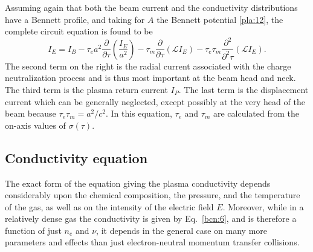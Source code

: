 \documentclass [12pt,a4paper,     ]{report} %
\begin{document}
   Assuming again that both the beam current and the conductivity distributions have a Bennett profile, and taking for $A$ the Bennett potential \eqref{pla:12}, the complete circuit equation is found to be
%
\begin{equation}\label{pla:19} %
    I_E = I_B - \tau_e    a^2 \frac{\partial}{\partial\tau}(\frac{I_E}{a^2})
              - \tau_m        \frac{\partial}{\partial\tau}(\mathcal{L}I_E)
              - \tau_e \tau_m \frac{\partial^2}{\partial^2\tau}(\mathcal{L}I_E).
\end{equation}
%
The second term on the right is the radial current associated with the charge neutralization process and is thus most important at the beam head and neck.  The third term is the plasma return current $I_P$.  The last term is the displacement current which can be generally neglected, except possibly at the very head of the beam because $\tau_e \tau_m = a^2/c^2$.  In this equation, $\tau_e$ and $\tau_m$ are calculated from the on-axis values of $\sigma(\tau)$.


\subsection{Conductivity equation}

	The exact form of the equation giving the plasma conductivity depends considerably upon the chemical composition, the pressure, and the temperature of the gas, as well as on the intensity of the electric field $E$.  Moreover, while in a relatively dense gas the conductivity is given by Eq.~\eqref{bcn:6}, and is therefore a function of just $n_e$ and $\nu$, it depends in the general case on many more parameters and effects than just electron-neutral momentum transfer collisions.
\end{document}
